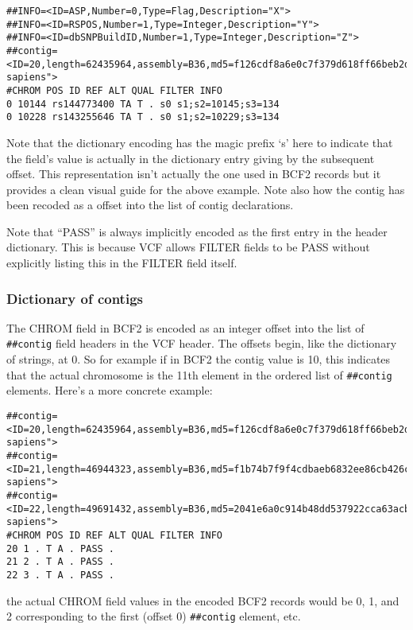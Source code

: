 \documentclass[8pt]{article}
\begin{document}
\small
\begin{verbatim}
##INFO=<ID=ASP,Number=0,Type=Flag,Description="X">
##INFO=<ID=RSPOS,Number=1,Type=Integer,Description="Y">
##INFO=<ID=dbSNPBuildID,Number=1,Type=Integer,Description="Z">
##contig=<ID=20,length=62435964,assembly=B36,md5=f126cdf8a6e0c7f379d618ff66beb2da,species="Homo sapiens">
#CHROM POS ID REF ALT QUAL FILTER INFO
0 10144 rs144773400 TA T . s0 s1;s2=10145;s3=134
0 10228 rs143255646 TA T . s0 s1;s2=10229;s3=134
\end{verbatim}
\normalsize

Note that the dictionary encoding has the magic prefix `s' here to indicate that the field's value is actually in the dictionary entry giving by the subsequent offset.  This representation isn't actually the one used in BCF2 records but it provides a clean visual guide for the above example.  Note also how the contig has been recoded as a offset into the list of contig declarations.

Note that ``PASS'' is always implicitly encoded as the first entry in the header dictionary.  This is because VCF allows FILTER fields to be PASS without explicitly listing this in the FILTER field itself.

\subsubsection{Dictionary of contigs}

The CHROM field in BCF2 is encoded as an integer offset into the list of \verb|##contig| field headers in the VCF header.  The offsets begin, like the dictionary of strings, at 0.  So for example if in BCF2 the contig value is 10, this indicates that the actual chromosome is the 11th element in the ordered list of \verb|##contig| elements.  Here's a more concrete example:

\small
\begin{verbatim}
##contig=<ID=20,length=62435964,assembly=B36,md5=f126cdf8a6e0c7f379d618ff66beb2da,species="Homo sapiens">
##contig=<ID=21,length=46944323,assembly=B36,md5=f1b74b7f9f4cdbaeb6832ee86cb426c6,species="Homo sapiens">
##contig=<ID=22,length=49691432,assembly=B36,md5=2041e6a0c914b48dd537922cca63acb8,species="Homo sapiens">
#CHROM POS ID REF ALT QUAL FILTER INFO
20 1 . T A . PASS .
21 2 . T A . PASS .
22 3 . T A . PASS .
\end{verbatim}
\normalsize

the actual CHROM field values in the encoded BCF2 records would be 0, 1, and 2 corresponding to the first (offset 0) \verb|##contig| element, etc.
\end{document}

